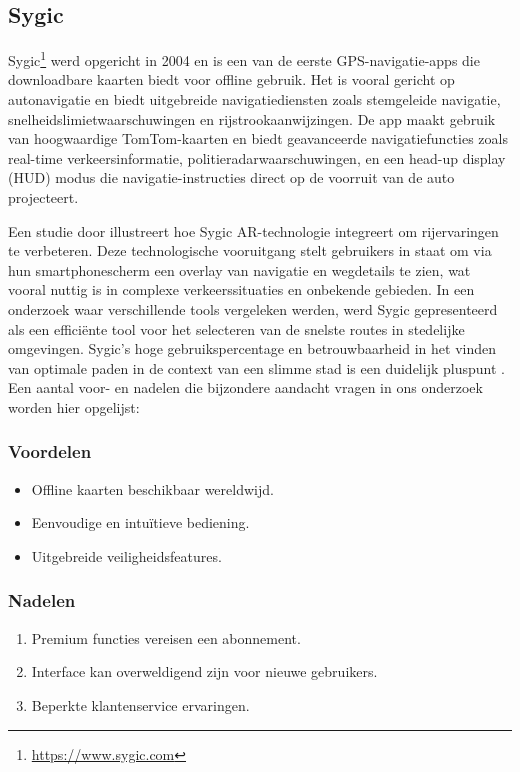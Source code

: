 \subsection{Sygic}
Sygic\footnote{\url{https://www.sygic.com}} werd opgericht in 2004 en is een van de eerste GPS-navigatie-apps die downloadbare kaarten biedt voor offline gebruik. Het is vooral gericht op autonavigatie en biedt uitgebreide navigatiediensten zoals stemgeleide navigatie, snelheidslimietwaarschuwingen en rijstrookaanwijzingen. De app maakt gebruik van hoogwaardige TomTom-kaarten en biedt geavanceerde navigatiefuncties zoals real-time verkeersinformatie, politieradarwaarschuwingen, en een head-up display (HUD) modus die navigatie-instructies direct op de voorruit van de auto projecteert. 

Een studie door \textcite{Wnorowski2018} illustreert hoe Sygic AR-technologie integreert om rijervaringen te verbeteren. Deze technologische vooruitgang stelt gebruikers in staat om via hun smartphonescherm een overlay van navigatie en wegdetails te zien, wat vooral nuttig is in complexe verkeerssituaties en onbekende gebieden. In een onderzoek waar verschillende tools vergeleken werden, werd Sygic gepresenteerd als een efficiënte tool voor het selecteren van de snelste routes in stedelijke omgevingen. Sygic's hoge gebruikspercentage en betrouwbaarheid in het vinden van optimale paden in de context van een slimme stad is een duidelijk pluspunt \autocite{Putra2021}. Een aantal voor- en nadelen die bijzondere aandacht vragen in ons onderzoek worden hier opgelijst:

\subsubsection*{Voordelen}
\begin{itemize}
    \item Offline kaarten beschikbaar wereldwijd.
    \item Eenvoudige en intuïtieve bediening.
    \item Uitgebreide veiligheidsfeatures.
\end{itemize}
\subsubsection*{Nadelen}
\begin{enumerate}
    \item Premium functies vereisen een abonnement.
    \item Interface kan overweldigend zijn voor nieuwe gebruikers.
    \item Beperkte klantenservice ervaringen.
\end{enumerate}

